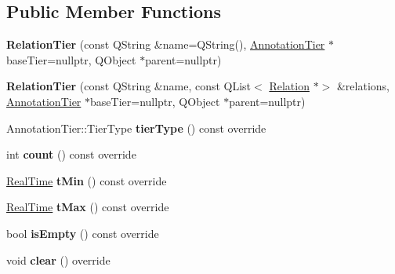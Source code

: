\subsection*{Public Member Functions}
\begin{DoxyCompactItemize}
\item 
\mbox{\label{class_relation_tier_a48952d4b70da53ae0c18483bc39e98a9}} 
{\bfseries Relation\+Tier} (const Q\+String \&name=Q\+String(), \hyperlink{class_annotation_tier}{Annotation\+Tier} $\ast$base\+Tier=nullptr, Q\+Object $\ast$parent=nullptr)
\item 
\mbox{\label{class_relation_tier_a07101451d03ec098f8d222f8e9542555}} 
{\bfseries Relation\+Tier} (const Q\+String \&name, const Q\+List$<$ \hyperlink{class_relation}{Relation} $\ast$$>$ \&relations, \hyperlink{class_annotation_tier}{Annotation\+Tier} $\ast$base\+Tier=nullptr, Q\+Object $\ast$parent=nullptr)
\item 
\mbox{\label{class_relation_tier_ac3d960aeab0859bd95d92feb34978ad4}} 
Annotation\+Tier\+::\+Tier\+Type {\bfseries tier\+Type} () const override
\item 
\mbox{\label{class_relation_tier_a2dff1610758628ca20e7e60242532e8c}} 
int {\bfseries count} () const override
\item 
\mbox{\label{class_relation_tier_a41c493332699f630909fe97a0863fd9b}} 
\hyperlink{struct_real_time}{Real\+Time} {\bfseries t\+Min} () const override
\item 
\mbox{\label{class_relation_tier_a98cc66e9b521e5c29786c54c4bbd758f}} 
\hyperlink{struct_real_time}{Real\+Time} {\bfseries t\+Max} () const override
\item 
\mbox{\label{class_relation_tier_a7de8fefbbf496d6c17211c594be6c790}} 
bool {\bfseries is\+Empty} () const override
\item 
\mbox{\label{class_relation_tier_a40f3f48e1939af0ff9343ead3128756e}} 
void {\bfseries clear} () override
\item 
\mbox{\label{class_relation_tier_ad0a3d689c1e77a9f115bb142e95274c4}} 
$$
\end{DoxyCompactItemize}
